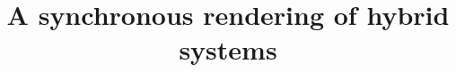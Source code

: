 \documentclass[10pt,journal,compsoc]{IEEEtran}
\begin{document}
%
\title{A synchronous rendering of hybrid systems}
%
%
%
%

\author{}

% 
%
\end{document}
